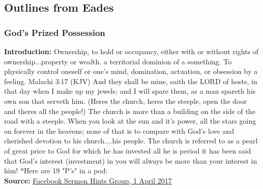 \subsection{Outlines from Eades}



\subsubsection{God's Prized Possession}
\textbf{Introduction:} Ownership, to hold or occupancy, either with or without rights of ownership...property or wealth.
a territorial dominion of a something.  To physically control oneself or one's mind, domination, actuation, or obsession by a feeling.
Malachi 3:17 (KJV)  And they shall be mine, saith the LORD of hosts, in that day when I make up my jewels; and I will spare them, as a man spareth his own son that serveth him.
(Heres the church, heres the steeple, open the door and theres all the people!)  The church is more than a building on the side of the road with a steeple. When you look at the sun and it's power, all the stars going on forever in the heavens; none of that is to compare with God's love and cherished devotion to his church....his people.  
The church is referred to as a pearl of great price to God for which he has invested all he is period it has been said that God's interest (investment) in you will always be more than your interest in him!
*Here are 19 "P's" in a pod:\\
\noindent \textbf{Source:} \href{https://www.facebook.com/groups/sermonhints/posts/1874296819478790}{Facebook Sermon Hints Group, 1 April 2017}
